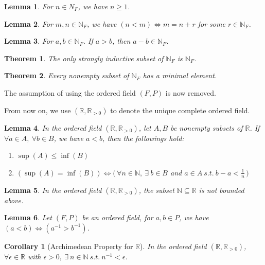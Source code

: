 \documentclass[11pt]{article}
\theoremstyle{break}
\theoremstyle{break}
\newtheorem{thm}{Theorem}[section]
\newtheorem{lem}{Lemma}[thm]
\newtheorem{corL}{Corollary}[lem]
\newcommand{\R}{\mathbb{R}}
\newcommand{\N}{\mathbb{N}}
\begin{document}
	\begin{lem}
		For $n \in N_F$, we have $n \geq 1$.
	\end{lem}
	
	\begin{lem}
		For $m,n \in \N_F$, we have $(n<m) \iff m=n+r$ for some $r \in \N_F$.
	\end{lem}
		
	\begin{lem}
		For $a,b \in \N_F$. If $a>b$, then $a-b \in \N_F$.
	\end{lem}
	
	\begin{thm}
		The only strongly inductive subset of $\N_F$ is $\N_F$.
	\end{thm}
	
	\begin{thm}
		Every nonempty subset of $\N_F$ has a minimal element.
	\end{thm}	

	
	\color{red} \noindent The assumption of using the ordered field $(F,P)$ is now removed. \color{black}	
	\clearpage
	
	\color{red} \noindent From now on, we use $(\R,\R_{>0})$ to denote the unique complete ordered field.\color{black}
	
	\begin{lem}
		In the ordered field $(\R,\R_{>0})$, let $A,B$ be nonempty subsets of $\R$. If $\forall a \in A, \ \forall b \in B$, we have $a<b$, then the followings hold:
		\begin{enumerate}[topsep=3pt,itemsep=-1ex,partopsep=1ex,parsep=1ex]
			\item $\sup(A) \leq \inf(B)$
			\item $(\sup(A) = \inf(B)) \iff (\, \forall n \in \N, \ \exists \ b \in B$ and $a \in A \ s.t. \ b-a < \frac{1}{n} \, )$
		\end{enumerate}
	\end{lem}	
	
	\begin{lem}
		In the ordered field $(\R,\R_{>0})$, the subset $\N \subseteq \R$ is not bounded above.
	\end{lem}
		
	\begin{lem}
		Let $(F,P)$ be an ordered field, for $a,b \in P$, we have $(a<b) \iff (a^{-1} > b^{-1})$.
	\end{lem}
	
	\begin{corL}[Archimedean Property for $\R$]
		In the ordered field $(\R,\R_{>0})$, $\forall \epsilon \in \R$ with $\epsilon >0, \ \exists \ n \in \N \ s.t. \ n^{-1} < \epsilon$.
	\end{corL}
	
\end{document}

